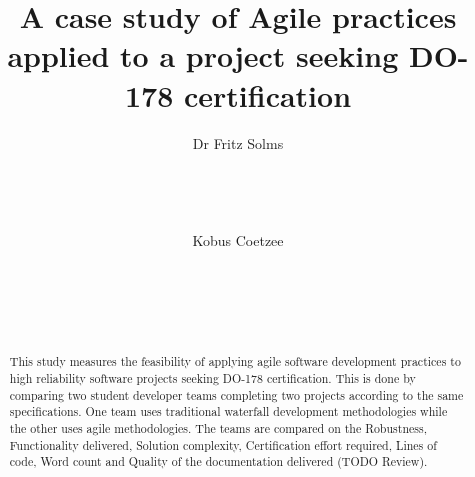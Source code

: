 \documentclass{sig-alternate-05-2015}
\begin{document}






%

\title{A case study of Agile practices applied to a project seeking DO-178 certification}

\author{
\alignauthor
Dr Fritz Solms\\
	   \\
       \\
       \\
       \\
\alignauthor
Kobus Coetzee\\
       \\
       \\
       \\
       \\
}

\maketitle
\begin{abstract}
This study measures the feasibility of applying agile software development practices to high reliability software projects seeking DO-178 certification. This is done by comparing two student developer teams completing two projects according to the same specifications. One team uses traditional waterfall development methodologies while the other uses agile methodologies. The teams are compared on the Robustness, Functionality delivered, Solution complexity, Certification effort required, Lines of code, Word count and Quality of the documentation delivered (TODO Review).
\end{abstract}
\end{document}
